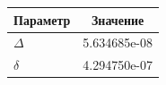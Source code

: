 \begin{tabular}{lc}
\toprule
Параметр & Значение \\
\midrule
$\Delta$ & 5.634685e-08 \\
$\delta$ & 4.294750e-07 \\
\bottomrule
\end{tabular}